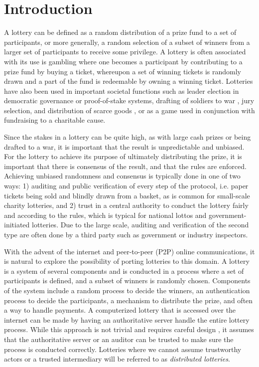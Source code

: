 \chapter{Introduction}
\label{chap:introduction}

A lottery can be defined as a random distribution of a prize fund to a set of participants, or more generally, a random selection of a subset of winners from a larger set of participants to receive some privilege. A lottery is often associated with its use is gambling where one becomes a participant by contributing to a prize fund by buying a ticket, whereupon a set of winning tickets is randomly drawn and a part of the fund is redeemable by owning a winning ticket. Lotteries have also been used in important societal functions such as leader election in democratic governance \cite{sintomer_random_2010} or proof-of-stake systems, drafting of soldiers to war \cite{nixon_executive_1969}, jury selection, and distribution of scarce goods \cite{the_economist_why_2018}, or as a game used in conjunction with fundraising to a charitable cause. 

Since the stakes in a lottery can be quite high, as with large cash prizes or being drafted to a war, it is important that the result is unpredictable and unbiased. For the lottery to achieve its purpose of ultimately distributing the prize, it is important that there is consensus of the result, and that the rules are enforced. Achieving unbiased randomness and consensus is typically done in one of two ways: 1) auditing and public verification of every step of the protocol, i.e. paper tickets being sold and blindly drawn from a basket, as is common for small-scale charity lotteries, and 2) trust in a central authority to conduct the lottery fairly and according to the rules, which is typical for national lottos and government-initiated lotteries. Due to the large scale, auditing and verification of the second type are often done by a third party such as government or industry inspectors.

With the advent of the internet and peer-to-peer (P2P) online communications, it is natural to explore the possibility of porting lotteries to this domain. A lottery is a system of several components and is conducted in a process where a set of participants is defined, and a subset of winners is randomly chosen. Components of the system include a random process to decide the winners, an authentication process to decide the participants, a mechanism to distribute the prize, and often a way to handle payments.  A computerized lottery that is accessed over the internet can be made by having an authoritative server handle the entire lottery process. While this approach is not trivial and requires careful design \cite{sako_implementation_1999} \cite{konstantinou_electronic_2004} \cite{konstantinou_trust_2005} \cite{chen_design_2005} \cite{kuacharoen_design_2012} \cite{chen_novel_2016}, it assumes that the authoritative server or an auditor can be trusted to make sure the process is conducted correctly. Lotteries where we cannot assume trustworthy actors or a trusted intermediary will be referred to as \emph{distributed lotteries}.

